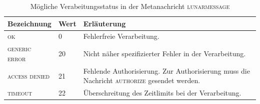 \documentclass[ngerman,11pt]{report}
\begin{document}
\begin{table}[]
\centering
\caption{Mögliche Verabeitungsstatus in der Metanachricht \textsc{lunarmessage}}
\label{table:messagesStatus}
\begin{tabularx}{\textwidth}{l|l|X}
Bezeichnung            & Wert & Erläuterung \\ \hline
\textsc{ok}            & 0    & Fehlerfreie Verarbeitung. \\
\textsc{generic error} & 20   & Nicht näher spezifizierter Fehler in der Verarbeitung.  \\
\textsc{access denied} & 21   & Fehlende Authorisierung. Zur Authorisierung muss die
                                Nachricht \textsc{authorize} gesendet werden. \\
\textsc{timeout}       & 22   & Überschreitung des Zeitlimits bei der Verarbeitung.
\end{tabularx}
\end{table}
\end{document}
